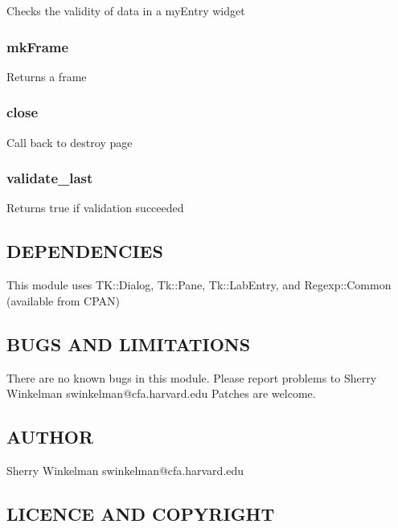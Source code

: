 \documentclass{article}
\begin{document}
Checks the validity of data in a myEntry widget

\subsubsection*{mkFrame\label{BVPage_mkFrame}}


Returns a frame

\subsubsection*{close\label{BVPage_close}}


Call back to destroy page

\subsubsection*{validate\_last\label{BVPage_validate_last}}


Returns true if validation succeeded

\subsection*{DEPENDENCIES\label{BVPage_DEPENDENCIES}}


This module uses TK::Dialog, Tk::Pane, Tk::LabEntry,
and Regexp::Common (available from CPAN)

\subsection*{BUGS AND LIMITATIONS\label{BVPage_BUGS_AND_LIMITATIONS}}


There are no known bugs in this module.
Please report problems to Sherry Winkelman swinkelman@cfa.harvard.edu
Patches are welcome.

\subsection*{AUTHOR\label{BVPage_AUTHOR}}


Sherry Winkelman swinkelman@cfa.harvard.edu

\subsection*{LICENCE AND COPYRIGHT\label{BVPage_LICENCE_AND_COPYRIGHT}}
\end{document}
